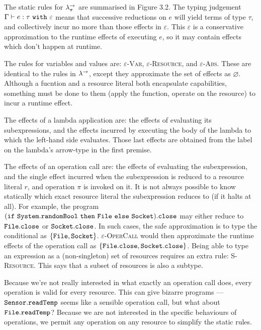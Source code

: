 The static rules for $\lambda^{\rightarrow}_{\pi}$ are summarised in Figure 3.2. The typing judgement $\Gamma \vdash e: \tau~\mathtt{with}~ \varepsilon$ means that successive reductions on $e$ will yield terms of type $\tau$, and collectively incur no more than those effects in $\varepsilon$. This $\varepsilon$ is a conservative approximation to the runtime effects of executing $e$, so it may contain effects which don't happen at runtime.

The rules for variables and values are: \textsc{$\varepsilon$-Var}, \textsc{$\varepsilon$-Resource}, and \textsc{$\varepsilon$-Abs}. These are identical to the rules in $\lambda^{\rightarrow}$, except they approximate the set of effects as $\varnothing$. Although a fucntion and a resource literal both encapsulate capabilities, something must be done to them (apply the function, operate on the resource) to incur a runtime effect.

The effects of a lambda application are: the effects of evaluating its subexpressions, and the effects incurred by executing the body of the lambda to which the left-hand side evaluates. Those last effects are obtained from the label on the lambda's arrow-type in the first premise.

The effects of an operation call are: the effects of evaluating the subexpression, and the single effect incurred when the subexpression is reduced to a resource literal $r$, and operation $\pi$ is invoked on it. It is not always possible to know statically which exact resource literal the subexpression reduces to (if it halts at all). For example, the program $\mathtt{(if~System.randomBool~then~File~else~Socket).close}$ may either reduce to $\mathtt{File.close}$ or $\mathtt{Socket.close}$. In such cases, the safe approximation is to type the conditional as $\{ \mathtt{File, Socket} \}$. \textsc{$\varepsilon$-OperCall} would then approximate the runtime effects of the operation call as  $\{ \mathtt{File.close, Socket.close} \}$. Being able to type an expression as a (non-singleton) set of resources requires an extra rule: \textsc{S-Resource}. This says that a subset of resources is also a subtype. 

Because we're not really interested in what exactly an operation call does, every operation is valid for every resource. This can give bizarre programs --- $\mathtt{Sensor.readTemp}$ seems like a sensible operation call, but what about $\mathtt{File.readTemp}$? Because we are not interested in the specific behaviours of operations, we permit any operation on any resource to simplify the static rules.


